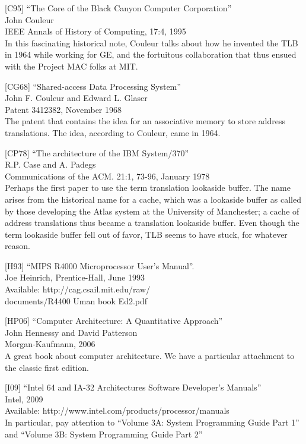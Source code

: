 {[}C95{]} ``The Core of the Black Canyon Computer Corporation''\\
John Couleur\\
IEEE Annals of History of Computing, 17:4, 1995\\
In this fascinating historical note, Couleur talks about how he invented
the TLB in 1964 while working for GE, and the fortuitous collaboration
that thus ensued with the Project MAC folks at MIT.

{[}CG68{]} ``Shared-access Data Processing System''\\
John F. Couleur and Edward L. Glaser\\
Patent 3412382, November 1968\\
The patent that contains the idea for an associative memory to store
address translations. The idea, according to Couleur, came in 1964.

{[}CP78{]} ``The architecture of the IBM System/370''\\
R.P. Case and A. Padegs\\
Communications of the ACM. 21:1, 73-96, January 1978\\
Perhaps the first paper to use the term translation lookaside buffer.
The name arises from the historical name for a cache, which was a
lookaside buffer as called by those developing the Atlas system at the
University of Manchester; a cache of address translations thus became a
translation lookaside buffer. Even though the term lookaside buffer fell
out of favor, TLB seems to have stuck, for whatever reason.

{[}H93{]} ``MIPS R4000 Microprocessor User's Manual''.\\
Joe Heinrich, Prentice-Hall, June 1993\\
Available: http://cag.csail.mit.edu/raw/\\
documents/R4400 Uman book Ed2.pdf

{[}HP06{]} ``Computer Architecture: A Quantitative Approach''\\
John Hennessy and David Patterson\\
Morgan-Kaufmann, 2006\\
A great book about computer architecture. We have a particular
attachment to the classic first edition.

{[}I09{]} ``Intel 64 and IA-32 Architectures Software Developer's
Manuals''\\
Intel, 2009\\
Available: http://www.intel.com/products/processor/manuals\\
In particular, pay attention to ``Volume 3A: System Programming Guide
Part 1'' and ``Volume 3B: System Programming Guide Part 2''

